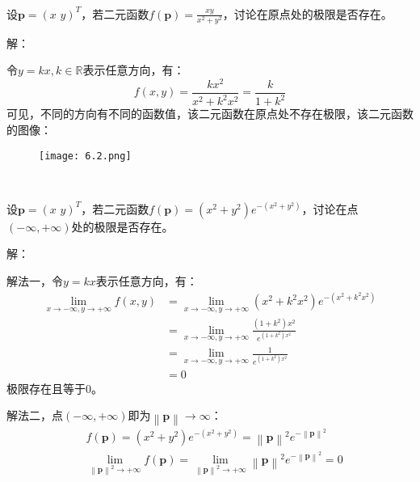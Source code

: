 ~

\begin{example}
设$\boldsymbol{p}=\left( x\,\,y \right) ^T$，若二元函数$f\left( \boldsymbol{p} \right) =\frac{xy}{x^2+y^2}$，讨论在原点处的极限是否存在。
\end{example}

解：

令$y=kx,k\in \mathbb{R} $表示任意方向，有：
\[
f\left( x,y \right) =\frac{kx^2}{x^2+k^2x^2}=\frac{k}{1+k^2}
\]
可见，不同的方向有不同的函数值，该二元函数在原点处不存在极限，该二元函数的图像：

\begin{figure}[ht]
\centering
\texttt{[image: 6.2.png]}
\end{figure}

~

\begin{example}
设$\boldsymbol{p}=\left( x\,\,y \right) ^T$，若二元函数$f\left( \boldsymbol{p} \right) =\left( x^2+y^2 \right) e^{-\left( x^2+y^2 \right)}$，讨论在点$\left( -\infty ,+\infty \right) $处的极限是否存在。
\end{example}

解：

解法一，令$y=kx$表示任意方向，有：
\begin{align*}
    \underset{x\rightarrow -\infty ,y\rightarrow +\infty}{\lim}f\left( x,y \right) &=\underset{x\rightarrow -\infty ,y\rightarrow +\infty}{\lim}\left( x^2+k^2x^2 \right) e^{-\left( x^2+k^2x^2 \right)} \\
    &=\underset{x\rightarrow -\infty ,y\rightarrow +\infty}{\lim}\frac{\left( 1+k^2 \right) x^2}{e^{\left( 1+k^2 \right) x^2}} \\
    &=\underset{x\rightarrow -\infty ,y\rightarrow +\infty}{\lim}\frac{1}{e^{\left( 1+k^2 \right) x^2}} \\
    &=0
\end{align*}
极限存在且等于0。

解法二，点$\left( -\infty ,+\infty \right) $即为$\left\| \boldsymbol{p} \right\| \rightarrow \infty $：
\begin{align*}
&f\left( \boldsymbol{p} \right) =\left( x^2+y^2 \right) e^{-\left( x^2+y^2 \right)}=\left\| \boldsymbol{p} \right\| ^2e^{-\left\| \boldsymbol{p} \right\| ^2} \\
&\underset{\left\| \boldsymbol{p} \right\| ^2\rightarrow +\infty}{\lim}f\left( \boldsymbol{p} \right) =\underset{\left\| \boldsymbol{p} \right\| ^2\rightarrow +\infty}{\lim}\left\| \boldsymbol{p} \right\| ^2e^{-\left\| \boldsymbol{p} \right\| ^2}=0
\end{align*}




